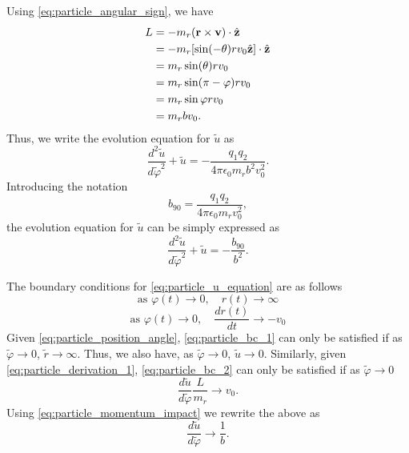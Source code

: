 \documentclass[a4paper,11pt]{report}
\begin{document}
Using \cref{eq:particle_angular_sign}, we have
\begin{align}
    \label{eq:particle_momentum_impact}
    L &= -m_r ( \mathbf{r} \times \mathbf{v} )\cdot \hat{\mathbf{z}} \nonumber \\
    &= -m_r [\sin(-\theta) r v_0 \hat{\mathbf{z}} ] \cdot \hat{\mathbf{z}} \nonumber \\
    &= m_r\sin(\theta) r v_0 \nonumber \\
    &= m_r\sin(\pi - \varphi) r v_0 \nonumber \\
    &= m_r\sin\varphi r v_0 \nonumber \\
    &= m_r b v_0.
\end{align}
Thus, we write the evolution equation for $\tilde{u}$ as
\begin{equation}
    \frac{d^2 \tilde{u}}{d \tilde{\varphi}^2} + \tilde{u} = -\frac{q_1 q_2}{4 \pi \epsilon_0 m_r b^2 v_0^2}.
\end{equation}
Introducing the notation
\begin{equation}
    b_{90} = \frac{q_1 q_2}{4 \pi \epsilon_0 m_r v_0^2},
\end{equation}
the evolution equation for $\tilde{u}$ can be simply expressed as
\begin{equation}
    \label{eq:particle_u_equation}
    \frac{d^2 \tilde{u}}{d \tilde{\varphi}^2} + \tilde{u} = -\frac{b_{90}}{b^2}.
\end{equation}

The boundary conditions for \cref{eq:particle_u_equation} are as follows
\begin{equation}
    \label{eq:particle_bc_1}
    \text{as } \varphi(t) \to 0, \quad r(t) \to \infty
\end{equation}
\begin{equation}
    \label{eq:particle_bc_2}
    \text{as } \varphi(t) \to 0, \quad \frac{dr(t)}{dt} \to -v_0
\end{equation}
Given \cref{eq:particle_position_angle}, \cref{eq:particle_bc_1} can only be satisfied if as $\tilde{\varphi} \to 0$, $\tilde{r} \to \infty$. Thus, we also have, as $\tilde{\varphi} \to 0$, $\tilde{u} \to 0$. Similarly, given \cref{eq:particle_derivation_1}, \cref{eq:particle_bc_2} can only be satisfied if as $\tilde{\varphi} \to 0$
\begin{equation}
    \frac{d\tilde{u}}{d\tilde{\varphi}} \frac{L}{m_r} \to v_0.
\end{equation}
Using \cref{eq:particle_momentum_impact} we rewrite the above as 
\begin{equation}
    \frac{d\tilde{u}}{d\tilde{\varphi}} \to \frac{1}{b}.
\end{equation}
\end{document}
